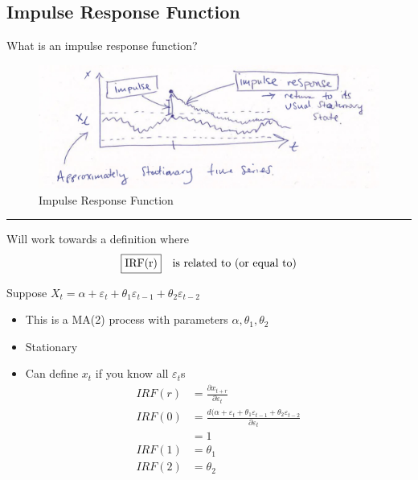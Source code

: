 \subsection{Impulse Response Function}
What is an impulse response function? \\
\begin{figure}[H]
    \centering
    \includegraphics[width=0.8\linewidth]{images/Screenshot 2024-05-21 at 18.13.20.jpg}
    \caption{Impulse Response Function}
\end{figure}


\noindent
\rule{\linewidth}{0.4pt}
Will work towards a definition where 
\begin{align*}
    &\fbox{IRF(r)} \quad \text{is related to (or equal to)} \\
\end{align*}

Suppose $X_t=\alpha + \varepsilon_t +\theta_1 \varepsilon_{t-1} + \theta_2 \varepsilon_{t-2}$ 
\begin{itemize}
    \item This is a MA(2) process with parameters $\alpha, \theta_1, \theta_2$
    \item Stationary
    \item Can define $x_t$ if you know all $\varepsilon_t$s 
    \begin{align*}
    IRF(r)&=\frac{\partial x_{t+r}}{\partial \varepsilon_t}\\
    IRF(0)&= \frac{d(\alpha+\varepsilon_t+\theta_1 \varepsilon_{t-1}+\theta_2 \varepsilon_{t-2}}{\partial \varepsilon_t}\\ 
    &=1\\
    IRF(1)&=\theta_1\\
    IRF(2)&=\theta_2
    \end{align*}
\end{itemize}

